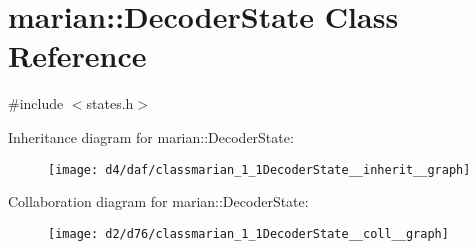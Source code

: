 \hypertarget{classmarian_1_1DecoderState}{}\section{marian\+:\+:Decoder\+State Class Reference}
\label{classmarian_1_1DecoderState}


{\ttfamily \#include $<$states.\+h$>$}



Inheritance diagram for marian\+:\+:Decoder\+State\+:
\nopagebreak
\begin{figure}[H]
\begin{center}
\leavevmode
\texttt{[image: d4/daf/classmarian\_1\_1DecoderState\_\_inherit\_\_graph]}
\end{center}
\end{figure}


Collaboration diagram for marian\+:\+:Decoder\+State\+:
\nopagebreak
\begin{figure}[H]
\begin{center}
\leavevmode
\texttt{[image: d2/d76/classmarian\_1\_1DecoderState\_\_coll\_\_graph]}
\end{center}
\end{figure}
